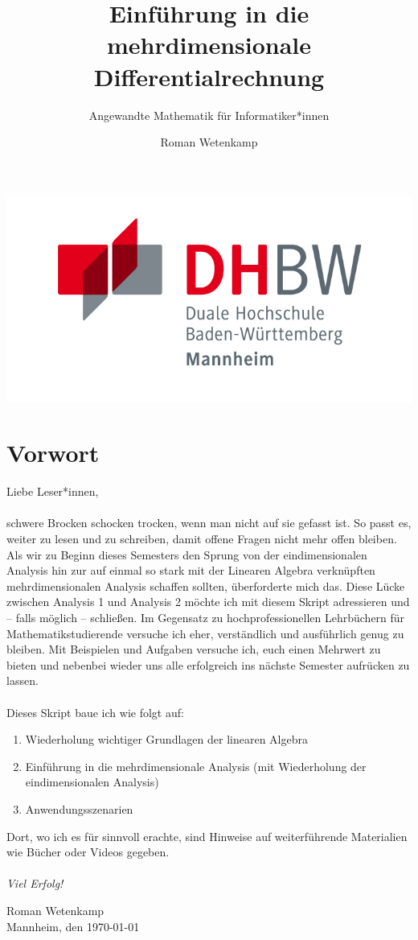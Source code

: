 \documentclass[11pt,a4paper]{scrartcl}
\author{Roman Wetenkamp}
\title{Einführung in die mehrdimensionale Differentialrechnung}
\subtitle{Angewandte Mathematik für Informatiker*innen}
\theoremstyle{remark}
\theoremstyle{definition}
\begin{document}
\vspace{3cm}
\maketitle
\begin{center}
\includegraphics[scale=0.7]{DHBW.jpg}
\end{center}
\pagebreak
\tableofcontents
\pagebreak
\section*{Vorwort}
Liebe Leser*innen, \\\\
schwere Brocken schocken trocken, wenn man nicht auf sie gefasst ist. So passt es, weiter zu lesen und zu schreiben, damit offene Fragen nicht mehr offen bleiben. Als wir zu Beginn dieses Semesters den Sprung von der eindimensionalen Analysis hin zur auf einmal so stark mit der Linearen Algebra verknüpften mehrdimensionalen Analysis schaffen sollten, überforderte mich das. Diese Lücke zwischen Analysis 1 und Analysis 2 möchte ich mit diesem Skript adressieren und -- falls möglich -- schließen. Im Gegensatz zu hochprofessionellen Lehrbüchern für Mathematikstudierende versuche ich eher, verständlich und ausführlich genug zu bleiben. Mit Beispielen und Aufgaben versuche ich, euch einen Mehrwert zu bieten und nebenbei wieder uns alle erfolgreich ins nächste Semester aufrücken zu lassen. \\\\
Dieses Skript baue ich wie folgt auf:
\begin{enumerate}
\item Wiederholung wichtiger Grundlagen der linearen Algebra
\item Einführung in die mehrdimensionale Analysis (mit Wiederholung der eindimensionalen Analysis)
\item Anwendungsszenarien
\end{enumerate}
Dort, wo ich es für sinnvoll erachte, sind Hinweise auf weiterführende Materialien wie Bücher oder Videos gegeben. \\\\
\textit{Viel Erfolg!}  \\
\begin{flushright}
Roman Wetenkamp \\
Mannheim, den \today
\end{flushright}  
\vfill
\end{document}
